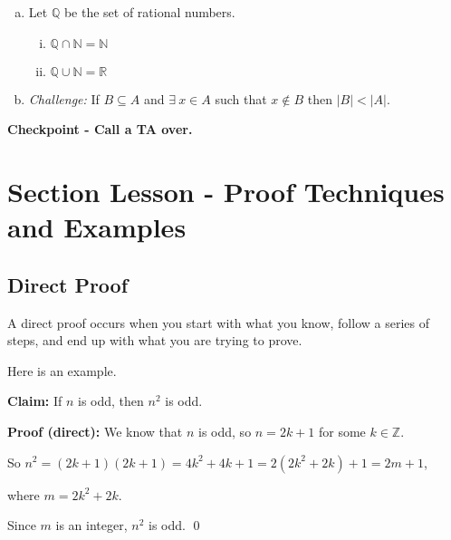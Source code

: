 \documentclass[12pt,letterpaper]{article}
\newcommand\N{\mathbb N}
\newcommand\Z{\mathbb Z}
\newcommand\R{\mathbb R}
\newif\ifsol
\begin{document}
\begin{enumerate}[a.]
        \item Let $\mathbb{Q}$ be the set of rational numbers. 
        \begin{enumerate}[i.]
          \item $\mathbb{Q} \cap \N = \N$  \ifsol  (T)  \fi
          \item $\mathbb{Q} \cup \N = \R$  \ifsol  (F)  \fi
        \end{enumerate}
        \item \textit{Challenge:} If $B \subseteq A$ and $\exists \ x \in A$ such that $x \not\in B$ then $|B| < |A|$.  \ifsol  (T if finite, F if infinite)  \fi
      \end{enumerate}

	\textbf{Checkpoint - Call a TA over.}

      \section*{Section Lesson - Proof Techniques and Examples}

      \subsection*{Direct Proof}

      A direct proof occurs when you start with what you know, follow a series of steps, and end up with what you are trying to prove.

      Here is an example. 

      \textbf{Claim:} If $n$ is odd, then $n^2$ is odd.

      \textbf{Proof (direct):} We know that $n$ is odd, so $n = 2k + 1$ for some $k \in \Z$.

      So $n^2 = (2k+1)(2k+1) = 4k^2 + 4k + 1 = 2(2k^2 + 2k) + 1 = 2m+1$,

      where $m =  2k^2 + 2k$.

      Since $m$ is an integer, $n^2$ is odd. \qed
\end{document}
